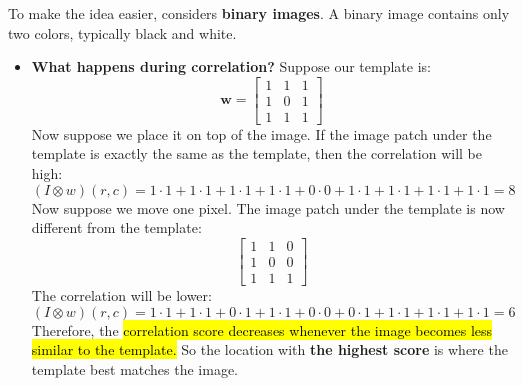 \highspace
To make the idea easier, considers \textbf{binary images}. A binary image contains only two colors, typically black and white.
\begin{itemize}
    \item[\textcolor{Green3}{\faIcon{question-circle}}] \textcolor{Green3}{\textbf{What happens during correlation?}} Suppose our template is:
    \begin{equation*}
        \mathbf{w} = \begin{bmatrix}
            1 & 1 & 1 \\
            1 & 0 & 1 \\
            1 & 1 & 1
        \end{bmatrix}
    \end{equation*}
    Now suppose we place it on top of the image. If the image patch under the template is exactly the same as the template, then the correlation will be high:
    \begin{equation*}
        \left(I \otimes w\right)\left(r,c\right) = 1 \cdot 1 + 1 \cdot 1 + 1 \cdot 1 + 1 \cdot 1 + 0 \cdot 0 + 1 \cdot 1 + 1 \cdot 1 + 1 \cdot 1 + 1 \cdot 1 = 8
    \end{equation*}
    Now suppose we move one pixel. The image patch under the template is now different from the template:
    \begin{equation*}
        \begin{bmatrix}
            1 & 1 & 0 \\
            1 & 0 & 0 \\
            1 & 1 & 1
        \end{bmatrix}
    \end{equation*}
    The correlation will be lower:
    \begin{equation*}
        \left(I \otimes w\right)\left(r,c\right) = 1 \cdot 1 + 1 \cdot 1 + 0 \cdot 1 + 1 \cdot 1 + 0 \cdot 0 + 0 \cdot 1 + 1 \cdot 1 + 1 \cdot 1 + 1 \cdot 1 = 6
    \end{equation*}
    Therefore, the \hl{correlation score decreases whenever the image becomes less similar to the template.} So the location with \textbf{the highest score} is where the template best matches the image.


\end{itemize}
